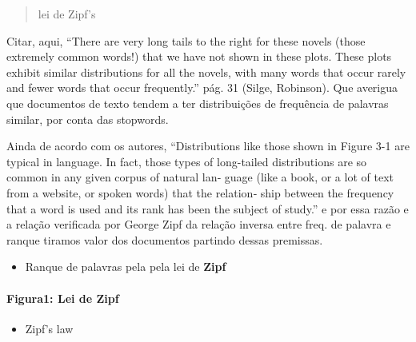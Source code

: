\documentclass[]{article}
\newenvironment{Shaded}{\begin{snugshade}}{\end{snugshade}}
\newcommand{\KeywordTok}[1]{\textcolor[rgb]{0.13,0.29,0.53}{\textbf{#1}}}
\newcommand{\DataTypeTok}[1]{\textcolor[rgb]{0.13,0.29,0.53}{#1}}
\newcommand{\StringTok}[1]{\textcolor[rgb]{0.31,0.60,0.02}{#1}}
\newcommand{\OperatorTok}[1]{\textcolor[rgb]{0.81,0.36,0.00}{\textbf{#1}}}
\newcommand{\NormalTok}[1]{#1}
\providecommand{\tightlist}{%
  \setlength{\itemsep}{0pt}\setlength{\parskip}{0pt}}
\let\oldparagraph\paragraph
\renewcommand{\paragraph}[1]{\oldparagraph{#1}\mbox{}}
\begin{document}
\begin{quote}
lei de Zipf's
\end{quote}

Citar, aqui, ``There are very long tails to the right for these novels
(those extremely common words!) that we have not shown in these plots.
These plots exhibit similar distributions for all the novels, with many
words that occur rarely and fewer words that occur frequently.'' pág. 31
(Silge, Robinson). Que averigua que documentos de texto tendem a ter
distribuições de frequência de palavras similar, por conta das
stopwords.

Ainda de acordo com os autores, ``Distributions like those shown in
Figure 3-1 are typical in language. In fact, those types of long-tailed
distributions are so common in any given corpus of natural lan‐ guage
(like a book, or a lot of text from a website, or spoken words) that the
relation‐ ship between the frequency that a word is used and its rank
has been the subject of study.'' e por essa razão e a relação verificada
por George Zipf da relação inversa entre freq. de palavra e ranque
tiramos valor dos documentos partindo dessas premissas.

\begin{itemize}
\tightlist
\item
  Ranque de palavras pela pela lei de \textbf{Zipf}
\end{itemize}

\begin{Shaded}
\end{Shaded}

\paragraph{Figura1: Lei de Zipf}\label{figura1-lei-de-zipf}

\begin{itemize}
\tightlist
\item
  Zipf's law
\end{itemize}
\end{document}
